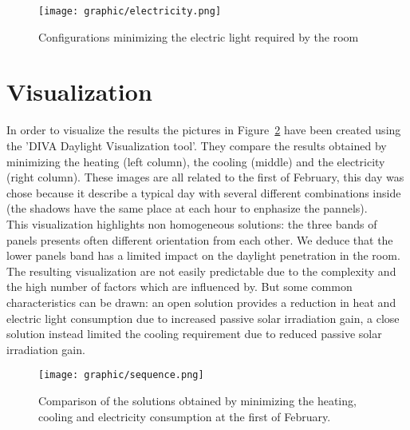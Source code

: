 \begin{figure}[h]
 \centering
 \texttt{[image: graphic/electricity.png]}
 \caption{Configurations minimizing the electric light required by the room}
 \label{light}
\end{figure}

\newpage
\section{Visualization}

In order to visualize the results the pictures in Figure~\ref{visualization} have been created using the 'DIVA Daylight Visualization tool'. They compare the results obtained by minimizing the heating (left column), the cooling (middle) and the electricity (right column).
These images are all related to the first of February, this day was chose because it describe a typical day with several different combinations inside (the shadows have the same place at each hour to enphasize the pannels).\\
This visualization highlights non homogeneous solutions: the three bands of panels presents often different orientation from each other. We deduce that the lower panels band has a limited impact on the daylight penetration in the room.\\
The resulting visualization are not easily predictable due to the complexity and the high number of factors which are influenced by. But some common characteristics can be drawn: an open solution provides a reduction in heat and electric light consumption due to increased passive solar irradiation gain, a close solution instead limited the cooling requirement due to reduced passive solar irradiation gain.

\begin{figure}[h]
 \centering
 \texttt{[image: graphic/sequence.png]}
 \caption{Comparison of the solutions obtained by minimizing the heating, cooling and electricity consumption at the first of February.}
 \label{visualization}
\end{figure}